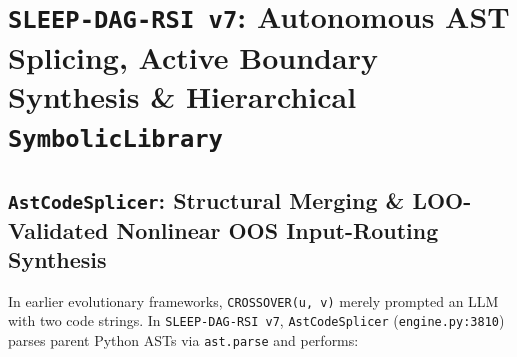 \documentclass[11pt,a4paper]{article}
\begin{document}
\section{\texttt{SLEEP-DAG-RSI v7}: Autonomous AST Splicing, Active Boundary Synthesis \& Hierarchical \texttt{SymbolicLibrary}}
\label{sec:v7}

\subsection{\texttt{AstCodeSplicer}: Structural Merging \& LOO-Validated Nonlinear OOS Input-Routing Synthesis}

In earlier evolutionary frameworks, \texttt{CROSSOVER(u, v)} merely prompted an LLM with two code strings. In \texttt{SLEEP-DAG-RSI v7}, \texttt{AstCodeSplicer} (\texttt{engine.py:3810}) parses parent Python ASTs via \texttt{ast.parse} and performs:
\end{document}

